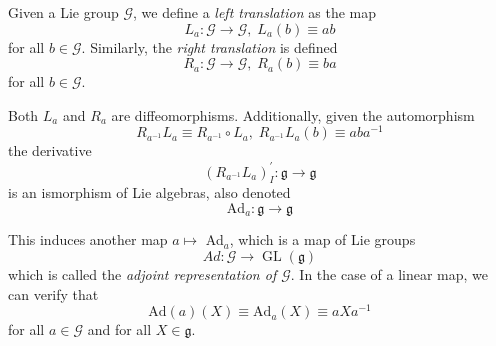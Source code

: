 \documentclass{article}
\DeclareMathOperator{\GL}{GL}
\begin{document}
    \begin{definition}
    Given a Lie group $\mathcal{G}$, we define a \textit{left translation} as the map
    \[L_a: \mathcal{G} \longrightarrow \mathcal{G}, \; L_a (b) \equiv a b\]
    for all $b \in \mathcal{G}$. Similarly, the \textit{right translation} is defined
    \[R_a: \mathcal{G} \longrightarrow \mathcal{G}, \; R_a (b) \equiv b a\]
    for all $b \in \mathcal{G}$. 
    \end{definition}

    Both $L_a$ and $R_a$ are diffeomorphisms. Additionally, given the automorphism
    \[R_{a^{-1}} L_a \equiv R_{a^{-1}} \circ L_a, \; R_{a^{-1}} L_a (b) \equiv a b a^{-1}\]
    the derivative
    \[(R_{a^{-1}} L_a)^\prime_I: \mathfrak{g} \longrightarrow \mathfrak{g}\]
    is an ismorphism of Lie algebras, also denoted 
    \[\text{Ad}_a: \mathfrak{g} \longrightarrow \mathfrak{g}\]
    \begin{definition}
    This induces another map $a \mapsto$ Ad$_a$, which is a map of Lie groups
    \[Ad: \mathcal{G} \longrightarrow \GL(\mathcal{\mathfrak{g}})\]
    which is called the \textit{adjoint representation of $\mathcal{G}$}. In the case of a linear map, we can verify that 
    \[\text{Ad}(a) (X) \equiv \text{Ad}_a (X) \equiv a X a^{-1}\]
    for all $a \in \mathcal{G}$ and for all $X \in \mathfrak{g}$. 
    \end{definition}
\end{document}
